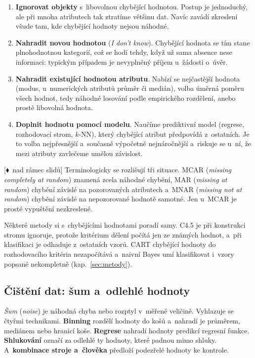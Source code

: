 \documentclass[11pt,a4paper]{article}
\theoremstyle{definition}
\newcommand{\mimo}{\textcolor{markcol}{\textsf{\footnotesize[$\blacklozenge$~nad rámec slidů]}}}
\begin{document}
\begin{enumerate}
\item \textbf{Ignorovat objekty} s~libovolnou chybějící hodnotou. Postup je jednoduchý, ale
      při mnoha atributech tak ztratíme většinu dat. Navíc zavádí zkreslení všude tam, kde
      chybějící hodnoty nejsou náhodné.
\item \textbf{Nahradit novou hodnotou}  (\emph{I don't know}). Chybějící hodnota se
      tím stane plnohodnotnou kategorií, což se hodí tehdy, když už sama absence nese
      informaci: typickým případem je nevyplněný příjem u~žádosti o~úvěr.
\item \textbf{Nahradit existující hodnotou atributu}. Nabízí se nejčastější hodnota (modus,
      u~numerických atributů průměr či medián), volba úměrná poměru všech hodnot, tedy
      náhodné losování podle empirického rozdělení, anebo prostě libovolná hodnota.
\item \textbf{Doplnit hodnotu pomocí modelu}. Naučíme prediktivní model (regrese, rozhodovací
      strom, $k$-NN), který chybějící atribut předpovídá z~ostatních. Je to volba nejpřesnější
      a~současně výpočetně nejnáročnější a~riskuje se u~ní, že mezi atributy zavlečeme umělou
      závislost.
\end{enumerate}

\mimo{} Terminologicky se rozlišují tři situace. MCAR (\emph{missing completely at random})
znamená zcela náhodné chybění, MAR (\emph{missing at random}) chybění závislé na pozorovaných
atributech a~MNAR (\emph{missing not at random}) chybění závislé na nepozorované hodnotě
samotné. Jen u~MCAR je prosté vypuštění nezkreslené.

Některé metody si s~chybějícími hodnotami poradí samy. C4.5 je při konstrukci stromu
ignoruje, protože kritérium dělení počítá jen ze známých hodnot, a~při klasifikaci je
odhaduje z~ostatních vzorů. CART chybějící hodnoty do rozhodovacího kritéria nezapočítává
a~naivní Bayes umí klasifikovat i~vzory popsané nekompletně (kap.~\ref{sec:metody}).

\subsection{Čištění dat: šum a~odlehlé hodnoty}

\emph{Šum} (\emph{noise}) je náhodná chyba nebo rozptyl v~měřené veličině. Vyhlazuje se čtyřmi
technikami. \textbf{Binning} rozdělí hodnoty do košů a~nahradí je průměrem, mediánem nebo
hranicí koše. \textbf{Regrese} nahradí hodnoty predikcí regresní funkce. \textbf{Shlukování}
označí za odlehlé ty hodnoty, které padnou mimo shluky. A~\textbf{kombinace stroje a~člověka}
předloží podezřelé hodnoty ke kontrole.
\end{document}
